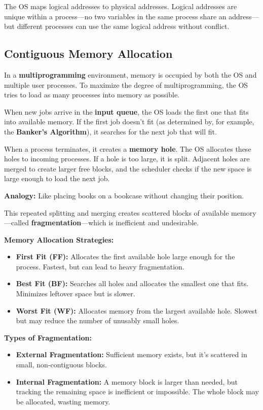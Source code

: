 \documentclass[a4paper, 10pt]{article}
\begin{document}
The OS maps logical addresses to physical addresses. Logical addresses are unique within a process—no two variables in the same process share an address—but different processes can use the same logical address without conflict.

\subsection{Contiguous Memory Allocation}
In a \textbf{multiprogramming} environment, memory is occupied by both the OS and multiple user processes. To maximize the degree of multiprogramming, the OS tries to load as many processes into memory as possible.

When new jobs arrive in the \textbf{input queue}, the OS loads the first one that fits into available memory. If the first job doesn't fit (as determined by, for example, the \textbf{Banker's Algorithm}), it searches for the next job that will fit.

When a process terminates, it creates a \textbf{memory hole}. The OS allocates these holes to incoming processes. If a hole is too large, it is split. Adjacent holes are merged to create larger free blocks, and the scheduler checks if the new space is large enough to load the next job.

\textbf{Analogy:} Like placing books on a bookcase without changing their position.

This repeated splitting and merging creates scattered blocks of available memory—called \textbf{fragmentation}—which is inefficient and undesirable.

\textbf{Memory Allocation Strategies:}
\begin{itemize}
    \item \textbf{First Fit (FF):} Allocates the first available hole large enough for the process. Fastest, but can lead to heavy fragmentation.
    \item \textbf{Best Fit (BF):} Searches all holes and allocates the smallest one that fits. Minimizes leftover space but is slower.
    \item \textbf{Worst Fit (WF):} Allocates memory from the largest available hole. Slowest but may reduce the number of unusably small holes.
\end{itemize}

\textbf{Types of Fragmentation:}
\begin{itemize}
    \item \textbf{External Fragmentation:} Sufficient memory exists, but it's scattered in small, non-contiguous blocks.
    \item \textbf{Internal Fragmentation:} A memory block is larger than needed, but tracking the remaining space is inefficient or impossible. The whole block may be allocated, wasting memory.
\end{itemize}
\end{document}
